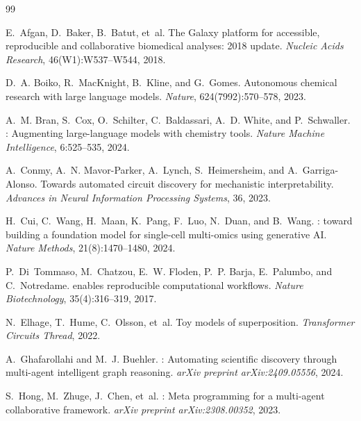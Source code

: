 \documentclass[11pt,a4paper]{article}
\begin{document}
\begin{thebibliography}{99}

E.~Afgan, D.~Baker, B.~Batut, et~al.
\newblock The {Galaxy} platform for accessible, reproducible and collaborative biomedical analyses: 2018 update.
\newblock \emph{Nucleic Acids Research}, 46(W1):W537--W544, 2018.

D.~A. Boiko, R.~MacKnight, B.~Kline, and G.~Gomes.
\newblock Autonomous chemical research with large language models.
\newblock \emph{Nature}, 624(7992):570--578, 2023.

A.~M. Bran, S.~Cox, O.~Schilter, C.~Baldassari, A.~D. White, and P.~Schwaller.
: Augmenting large-language models with chemistry tools.
\newblock \emph{Nature Machine Intelligence}, 6:525--535, 2024.

A.~Conmy, A.~N. Mavor-Parker, A.~Lynch, S.~Heimersheim, and A.~Garriga-Alonso.
\newblock Towards automated circuit discovery for mechanistic interpretability.
\newblock \emph{Advances in Neural Information Processing Systems}, 36, 2023.

H.~Cui, C.~Wang, H.~Maan, K.~Pang, F.~Luo, N.~Duan, and B.~Wang.
: toward building a foundation model for single-cell multi-omics using generative {AI}.
\newblock \emph{Nature Methods}, 21(8):1470--1480, 2024.

P.~Di~Tommaso, M.~Chatzou, E.~W. Floden, P.~P. Barja, E.~Palumbo, and C.~Notredame.
 enables reproducible computational workflows.
\newblock \emph{Nature Biotechnology}, 35(4):316--319, 2017.

N.~Elhage, T.~Hume, C.~Olsson, et~al.
\newblock Toy models of superposition.
\newblock \emph{Transformer Circuits Thread}, 2022.

A.~Ghafarollahi and M.~J. Buehler.
: Automating scientific discovery through multi-agent intelligent graph reasoning.
\newblock \emph{arXiv preprint arXiv:2409.05556}, 2024.

S.~Hong, M.~Zhuge, J.~Chen, et~al.
: Meta programming for a multi-agent collaborative framework.
\newblock \emph{arXiv preprint arXiv:2308.00352}, 2023.


\end{thebibliography}
\end{document}
